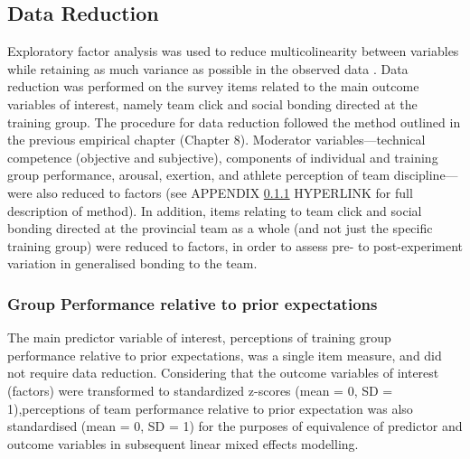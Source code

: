 \documentclass[english]{article}\usepackage[]{graphicx}\usepackage[]{color}
\begin{document}
\subsection{Data Reduction}
Exploratory factor analysis was used to reduce multicolinearity between variables while retaining as much variance as possible in the observed data \citep{Yong2013}.
Data reduction was performed on the survey items related to the main outcome variables of interest, namely team click and social bonding directed at the training group. The procedure for data reduction followed the method outlined in the previous empirical chapter (Chapter 8).  Moderator variables---technical competence (objective and subjective), components of individual and training group performance, arousal, exertion, and athlete perception of team discipline---were also reduced to factors (see APPENDIX \ref{} HYPERLINK for full description of method).  In addition, items relating to team click and social bonding directed at the provincial team as a whole (and not just the specific training group) were reduced to factors, in order to assess pre- to post-experiment variation in generalised bonding to the team.

\subsubsection{Group Performance relative to prior expectations}
The main predictor variable of interest, perceptions of training group performance relative to prior expectations, was a single item measure, and did not require data reduction.  Considering that the outcome variables of interest (factors) were transformed to standardized z-scores (mean = 0, SD = 1),perceptions of team performance relative to prior expectation was also standardised (mean = 0, SD = 1) for the purposes of equivalence of predictor and outcome variables in subsequent linear mixed effects modelling.
\end{document}
